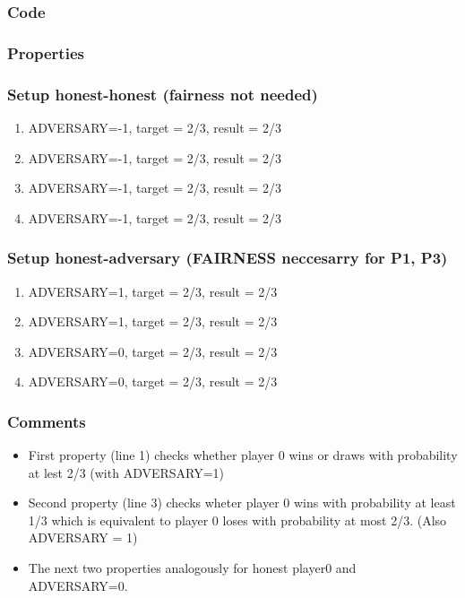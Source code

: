 \documentclass{article}
\begin{document}
\subsubsection{Code}



\subsubsection{Properties}



\subsubsection{Setup honest-honest (fairness not needed)}

\begin{enumerate}
\item ADVERSARY=-1, target = 2/3, result = 2/3
\item ADVERSARY=-1, target = 2/3, result = 2/3
\item ADVERSARY=-1, target = 2/3, result = 2/3
\item ADVERSARY=-1, target = 2/3, result = 2/3
\end{enumerate}

\subsubsection{Setup honest-adversary (FAIRNESS neccesarry for P1, P3)}

\begin{enumerate}
\item ADVERSARY=1, target = 2/3, result = 2/3
\item ADVERSARY=1, target = 2/3, result = 2/3
\item ADVERSARY=0, target = 2/3, result = 2/3
\item ADVERSARY=0, target = 2/3, result = 2/3
\end{enumerate}

\subsubsection{Comments}

\begin{itemize}
\item First property (line 1) checks whether player 0 wins or draws with probability at lest 2/3 (with ADVERSARY=1)
\item Second property (line 3) checks wheter player 0 wins with probability at least 1/3 which is equivalent to player 0
loses with probability at most 2/3. (Also ADVERSARY = 1)
\item The next two properties analogously for honest player0 and ADVERSARY=0.
\end{itemize}
\end{document}
